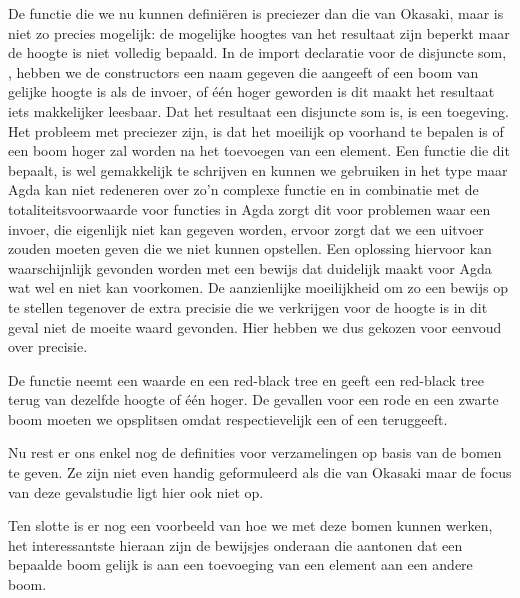 De  functie die we nu kunnen definiëren is preciezer dan die van
Okasaki, maar is niet zo precies mogelijk: de mogelijke hoogtes van het
resultaat zijn beperkt maar de hoogte is niet volledig bepaald. In de import
declaratie voor de disjuncte som, , hebben we de constructors
een naam gegeven die aangeeft of een boom van gelijke hoogte is als de invoer,
 of één hoger geworden is  dit maakt het resultaat iets
makkelijker leesbaar. Dat het resultaat een disjuncte som is, is een
toegeving. Het probleem met preciezer zijn, is dat het moeilijk op voorhand te
bepalen is of een boom hoger zal worden na het toevoegen van een element. Een
functie die dit bepaalt, is wel gemakkelijk te schrijven en kunnen we gebruiken
in het type maar Agda kan niet redeneren over zo'n complexe functie en in
combinatie met de totaliteitsvoorwaarde voor functies in Agda zorgt dit voor
problemen waar een invoer, die eigenlijk niet kan gegeven worden, ervoor zorgt
dat we een uitvoer zouden moeten geven die we niet kunnen opstellen. Een
oplossing hiervoor kan waarschijnlijk gevonden worden met een bewijs dat
duidelijk maakt voor Agda wat wel en niet kan voorkomen. De aanzienlijke
moeilijkheid om zo een bewijs op te stellen tegenover de extra precisie die we
verkrijgen voor de hoogte is in dit geval niet de moeite waard gevonden. Hier
hebben we dus gekozen voor eenvoud over precisie.


De  functie neemt een waarde en een red-black tree en geeft een
red-black tree terug van dezelfde hoogte of één hoger. De gevallen voor een
rode en een zwarte boom moeten we opsplitsen omdat  respectievelijk
een  of een  teruggeeft.

Nu rest er ons enkel nog de definities voor verzamelingen op basis van de bomen
te geven. Ze zijn niet even handig geformuleerd als die van Okasaki maar de
focus van deze gevalstudie ligt hier ook niet op.


Ten slotte is er nog een voorbeeld van hoe we met deze bomen kunnen werken, het
interessantste hieraan zijn de bewijsjes onderaan die aantonen dat een bepaalde
boom gelijk is aan een toevoeging van een element aan een andere boom.



